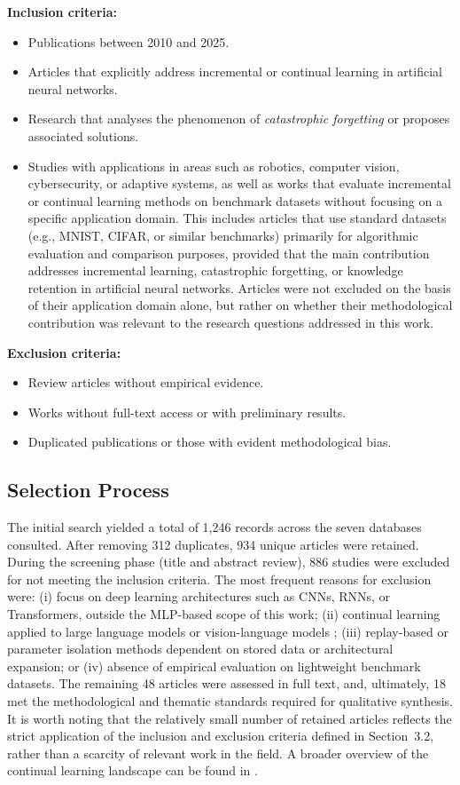 \textbf{Inclusion criteria:}
\begin{itemize}
    \item Publications between 2010 and 2025.
    \item Articles that explicitly address incremental or continual learning in artificial neural networks.
    \item Research that analyses the phenomenon of \textit{catastrophic forgetting} or proposes associated solutions.
    \item Studies with applications in areas such as robotics, computer vision, cybersecurity, 
or adaptive systems, as well as works that evaluate incremental or continual learning 
methods on benchmark datasets without focusing on a specific application domain. This 
includes articles that use standard datasets (e.g., MNIST, CIFAR, or similar benchmarks) 
primarily for algorithmic evaluation and comparison purposes, provided that the main 
contribution addresses incremental learning, catastrophic forgetting, or knowledge 
retention in artificial neural networks. Articles were not excluded on the basis of 
their application domain alone, but rather on whether their methodological contribution 
was relevant to the research questions addressed in this work.
\end{itemize}

\textbf{Exclusion criteria:}
\begin{itemize}
    \item Review articles without empirical evidence.
    \item Works without full-text access or with preliminary results.
    \item Duplicated publications or those with evident methodological bias.
\end{itemize}

\subsection{Selection Process}
The initial search yielded a total of 1,246 records across the seven databases consulted. 
After removing 312 duplicates, 934 unique articles were retained. During the screening 
phase (title and abstract review), 886 studies were excluded for not meeting the inclusion 
criteria. The most frequent reasons for exclusion were: (i) focus on deep learning 
architectures such as CNNs, RNNs, or Transformers, outside the MLP-based scope of this 
work; (ii) continual learning applied to large language models or vision-language models 
\cite{liu2025continual, shi2024continual}; (iii) replay-based or parameter isolation 
methods dependent on stored data or architectural expansion; or (iv) absence of empirical 
evaluation on lightweight benchmark datasets. The remaining 48 articles were assessed in 
full text, and, ultimately, 18 met the methodological and thematic standards required for 
qualitative synthesis. It is worth noting that the relatively small number of retained 
articles reflects the strict application of the inclusion and exclusion criteria defined 
in Section~3.2, rather than a scarcity of relevant work in the field. A broader overview 
of the continual learning landscape can be found in 
\cite{de2021continual, PARISI201954, liu2025continual}.

